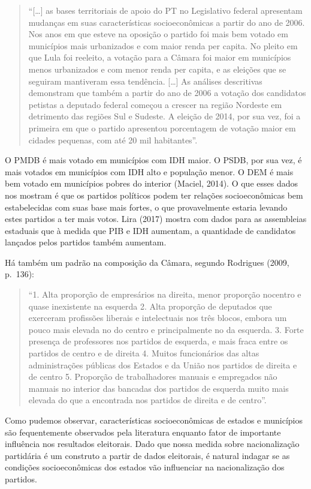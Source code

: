 \documentclass[]{article}
\begin{document}
\begin{quote}
``{[}\ldots{}{]} as bases territoriais de apoio do PT no Legislativo
federal apresentam mudanças em suas características socioeconômicas a
partir do ano de 2006. Nos anos em que esteve na oposição o partido foi
mais bem votado em municípios mais urbanizados e com maior renda per
capita. No pleito em que Lula foi reeleito, a votação para a Câmara foi
maior em municípios menos urbanizados e com menor renda per capita, e as
eleições que se seguiram mantiveram essa tendência. {[}\ldots{}{]} As
análises descritivas demonstram que também a partir do ano de 2006 a
votação dos candidatos petistas a deputado federal começou a crescer na
região Nordeste em detrimento das regiões Sul e Sudeste. A eleição de
2014, por sua vez, foi a primeira em que o partido apresentou
porcentagem de votação maior em cidades pequenas, com até 20 mil
habitantes''.
\end{quote}

O PMDB é mais votado em municípios com IDH maior. O PSDB, por sua vez, é
mais votados em municípios com IDH alto e população menor. O DEM é mais
bem votado em municípios pobres do interior (Maciel, 2014). O que esses
dados nos mostram é que os partidos políticos podem ter relações
socioeconômicas bem estabelecidas com suas base mais fortes, o que
provavelmente estaria levando estes partidos a ter mais votos. Lira
(2017) mostra com dados para as assembleias estaduais que à medida que
PIB e IDH aumentam, a quantidade de candidatos lançados pelos partidos
também aumentam.

Há também um padrão na composição da Câmara, segundo Rodrigues (2009,
p.~136):

\begin{quote}
``1. Alta proporção de empresários na direita, menor proporção nocentro
e quase inexistente na esquerda 2. Alta proporção de deputados que
exerceram profissões liberais e intelectuais nos três blocos, embora um
pouco mais elevada no do centro e principalmente no da esquerda. 3.
Forte presença de professores nos partidos de esquerda, e mais fraca
entre os partidos de centro e de direita 4. Muitos funcionários das
altas administrações públicas dos Estados e da União nos partidos de
direita e de centro 5. Proporção de trabalhadores manuais e empregados
não manuais no interior das bancadas dos partidos de esquerda muito mais
elevada do que a encontrada nos partidos de direita e de centro''.
\end{quote}

Como pudemos observar, características socioeconômicas de estados e
municípios são fequentemente observados pela literatura enquanto fator
de importante influência nos resultados eleitorais. Dado que nossa
medida sobre nacionalização partidária é um construto a partir de dados
eleitorais, é natural indagar se as condições socioeconômicas dos
estados vão influenciar na nacionalização dos partidos.
\end{document}

